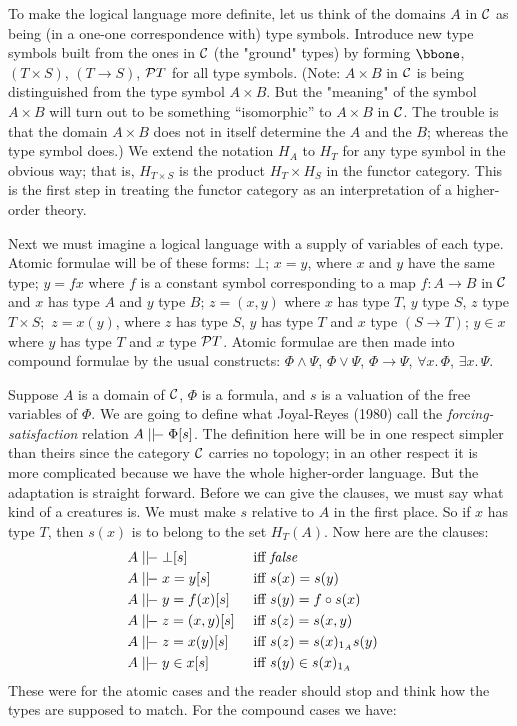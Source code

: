 To make the logical language more definite, let us think of the domains $A$ in $\C$ as being (in a one-one correspondence with) type symbols. Introduce new type symbols built from the ones
in $\C$ (the "ground" types) by forming $\bbone$, $(T \times S)$, $(T\to S)$, $\P T$ for all type symbols. (Note: $A \times B$ in $\C$ is being distinguished
from the type symbol $A \times B$. But the "meaning" of the symbol
$A\times B$ will turn out to be something ``isomorphic'' to $A\times B$ in $\C$. The trouble is that the domain $A \times B$ does not in itself deter­mine the $A$ and the $B$; whereas the type symbol does.) We extend the notation $H_A$ to $H_T$ for any type symbol in the obvious way;
that is, $H_{T \times S}$ is the product $H_T \times H_S$ in the functor category. This is the first step in treating the functor category as an interpretation of a higher-order theory.

Next we must imagine a logical language with a supply of variables of each type. Atomic formulae will be of these
forms: $\bot$; $x = y$, where $x$ and $y$ have the same type; $y = f x$
where $f$ is a constant symbol corresponding to a map $f: A	\to B$ in $\C$ and $x$ has type $A$ and $y$ type $B$; $z = (x,y)$ where $x$ has type $T$, $y$ type $S$, $z$ type $T \times S;$ $z = x(y)$, where $z$ has type $S$, $y$ has type $T$ and $x$ type $(S \to T)$; $y \in x$ where $y$ has type $T$ and $x$ type $\P T$. Atomic formulae are then made into compound formulae by the usual constructs: $\Phi \land \Psi$, $\Phi \lor \Psi$, $\Phi \to \Psi$, $\forall x. \, \Phi$, $\exists x. \, \Psi$.


Suppose $A$ is a domain of $\C$, $\Phi$ is a formula, and $s$ is a valu­ation of the free variables of $\Phi$. We are going to define what Joyal-Reyes (1980) call the {\it forcing-satisfaction} relation $A \mm \Phi[s]$. The definition here will be in one respect simpler
than theirs since the category $\C$ carries no topology; in an­ other respect it is more complicated because we have the whole higher-order language. But the adaptation is straight forward. Before we can give the clauses, we must say what kind of a creatures is. We must make $s$ relative to $A$ in the first place. So if $x$ has type $T$, then $s(x)$ is to belong to the set $H_T(A)$. Now here are the clauses:
\begin{align*}
  A & \mm \bot [s] & {\textrm{ iff }} & {\mathit { false }} &\\
  A & \mm x = y  [s] & {\textrm{ iff }} & s(x) = s(y) &\\
  A & \mm y = f(x) [s] & {\textrm{ iff }} & s(y) = f \comp s(x) &\\
  A & \mm z = (x,y) [s] & {\textrm{ iff }} & s(z) = s(x,y) &\\
  A & \mm z = x(y) [s] & {\textrm{ iff }} & s(z) = s(x)_{\id_A} s(y) &\\
  A & \mm y \in x [s] & {\textrm{ iff }} & s(y) \in s(x)_{\id_A} &\\
\end{align*}
These were for the atomic cases and the reader should stop and think how the types are supposed to match. For the compound cases we have:

